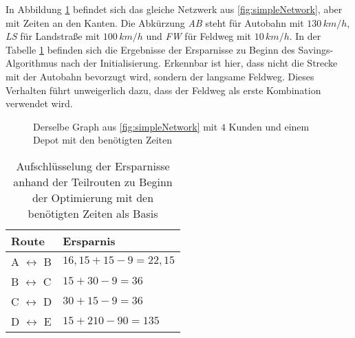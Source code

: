 \noindent
In Abbildung \ref{fig:simpleNetworkTime} befindet sich das gleiche Netzwerk aus \ref{fig:simpleNetwork}, aber mit Zeiten an den Kanten. 
Die Abkürzung \textit{AB} steht für Autobahn mit $130\,km/h$, \textit{LS} für Landstraße mit $100\,km/h$ und \textit{FW} für Feldweg mit $10\,km/h$. 
In der Tabelle \ref{tab:distSavingsZeit} befinden sich die Ergebnisse der Ersparnisse zu Beginn des Savings-Algorithmus nach der Initialisierung.
Erkennbar ist hier, dass nicht die Strecke mit der Autobahn bevorzugt wird, sondern der langsame Feldweg. 
Dieses Verhalten führt unweigerlich dazu, dass der Feldweg als erste Kombination verwendet wird. 
\begin{figure}
\centering
{}

	\caption{Derselbe Graph aus \ref{fig:simpleNetwork} mit $4$ Kunden und einem Depot mit den benötigten Zeiten}
	\label{fig:simpleNetworkTime}
\end{figure}
\begin{table}[htb]%
\centering
\begin{tabular}{p{3cm}|p{4cm}}
Route & Ersparnis \\ 
\hline 
A $\leftrightarrow$ B & $16,15 + 15 - 9 = 22,15$ \\ 
B $\leftrightarrow$ C & $15 + 30 - 9 = 36$ \\ 
C $\leftrightarrow$ D & $30 + 15 - 9 = 36$ \\ 
D $\leftrightarrow$ E & $15 + 210 - 90 = 135$ \\ 
\end{tabular} 
\caption{Aufschlüsselung der Ersparnisse anhand der Teilrouten zu Beginn der Optimierung mit den benötigten Zeiten als Basis}
\label{tab:distSavingsZeit}
\end{table}

